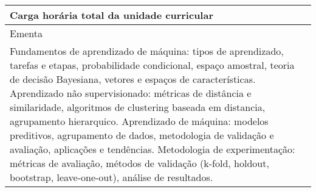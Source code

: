 \begin{quadro}[ht!]
\begin{tabular}{|p{3cm} p{2cm} p{3cm} p{2cm} p{3cm} p{2cm}|}
\multicolumn{5}{|p{13cm}|}{\cellcolor{blue1} Carga horária total da unidade curricular} & \multicolumn{1}{p{1cm}|}{\raggedleft 60	}\\\hline
\multicolumn{6}{|p{15cm}|}{\cellcolor{blue1} Ementa} \\\hline
\hline\multicolumn{6}{|p{15cm}|}{\scriptsize Fundamentos de aprendizado de máquina: tipos de aprendizado, tarefas e etapas, probabilidade condicional, espaço amostral, teoria de decisão Bayesiana, vetores e espaços de características. Aprendizado não supervisionado: métricas de distância e similaridade, algoritmos de clustering baseada em distancia, agrupamento hierarquico. Aprendizado de máquina: modelos preditivos, agrupamento de dados, metodologia de validação e avaliação, aplicações e tendências. Metodologia de experimentação: métricas de avaliação, métodos de validação (k-fold, holdout, bootstrap, leave-one-out), análise de resultados.}\\\hline
\hline
	\end{tabular}
\end{quadro}
